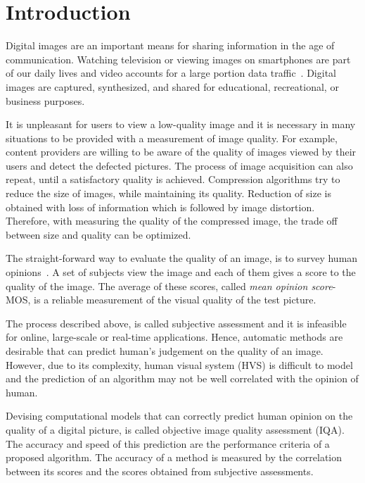 \chapter{Introduction}

Digital images are an important means for sharing information in the age of communication. Watching television or viewing images on smartphones are part of our daily lives and video accounts for a large portion data traffic~\cite{del}. Digital images are captured, synthesized, and shared for educational, recreational, or business purposes.

It is unpleasant for users to view a low-quality image and it is necessary in many situations to be provided with a measurement of image quality. For example, content providers are willing to be aware of the quality of images viewed by their users and detect the defected pictures. The process of image acquisition can also repeat, until a satisfactory quality is achieved. Compression algorithms try to reduce the size of images, while maintaining its quality. Reduction of size is obtained with loss of information which is followed by image distortion. Therefore, with measuring the quality of the compressed image, the trade off between size and quality can be optimized.

The straight-forward way to evaluate the quality of an image, is to survey human opinions~\cite{Ghadiyaram2016}. A set of subjects view the image and each of them gives a score to the quality of the image. The average of these scores, called \emph{mean opinion score}-MOS, is a reliable measurement of the visual quality of the test picture.

The process described above, is called subjective assessment and it is infeasible for online, large-scale or real-time applications. Hence, automatic methods are desirable that can predict human's judgement on the quality of an image. However, due to its complexity, human visual system (HVS) is difficult to model and the prediction of an algorithm may not be well correlated with the opinion of human.

Devising computational models that can correctly predict human opinion on the quality of a digital picture, is called objective image quality assessment (IQA). The accuracy and speed of this prediction are the performance criteria of a proposed algorithm. The accuracy of a method is measured by the correlation between its scores and the scores obtained from subjective assessments.

